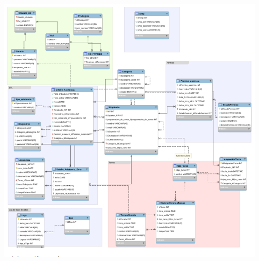\documentclass[12pt,spanish,Letterpaper,openany]{book}
\begin{document}
\begin {center}
\noindent\begin{minipage}[c]{\columnwidth}
\centering

\includegraphics[width=0.5\linewidth]{images/06_06}

\end{minipage}

\end {center}
\end{document}
